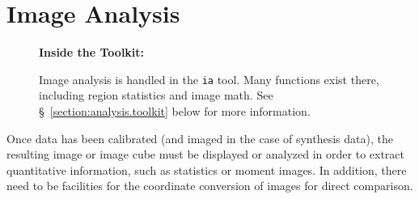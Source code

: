 

\chapter{Image Analysis}
\label{chapter:analysis}

\begin{wrapfigure}{r}{2.5in}
  \begin{boxedminipage}{2.5in}
     \centerline{\bf Inside the Toolkit:}
     Image analysis is handled in the {\tt ia} tool.
     Many functions exist there, including region statistics and
     image math. See \S~\ref{section:analysis.toolkit} below
     for more information.
  \end{boxedminipage}
\end{wrapfigure}

Once data has been calibrated (and imaged in the case of synthesis
data), the resulting image or image cube must be displayed or 
analyzed in order to extract quantitative information, such as
statistics or moment images.  In addition, there need to be facilities for
the coordinate conversion of images for direct comparison.

